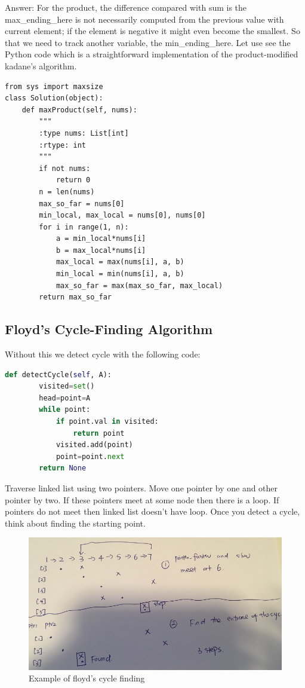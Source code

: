 \documentclass[../specific-algorithms.tex]{subfiles}
\begin{document}
Answer: For the product, the difference compared with sum is the max\_ending\_here is not necessarily computed from the previous value with current element; if the element is negative it might even become the smallest. So that we need to track another variable, the min\_ending\_here. Let use see the Python code which is a straightforward implementation of the product-modified kadane's algorithm. 
\begin{lstlisting}
from sys import maxsize
class Solution(object):
    def maxProduct(self, nums):
        """
        :type nums: List[int]
        :rtype: int
        """
        if not nums:
            return 0
        n = len(nums)
        max_so_far = nums[0]
        min_local, max_local = nums[0], nums[0]
        for i in range(1, n):
            a = min_local*nums[i]
            b = max_local*nums[i]
            max_local = max(nums[i], a, b)
            min_local = min(nums[i], a, b)
            max_so_far = max(max_so_far, max_local)
        return max_so_far
\end{lstlisting}





\subsection{Floyd’s Cycle-Finding Algorithm}

Without this we detect cycle with the following code:
\begin{lstlisting}[language = Python]
def detectCycle(self, A):
        visited=set()       
        head=point=A
        while point:
            if point.val in visited:
                return point
            visited.add(point)
            point=point.next
        return None
\end{lstlisting}

Traverse linked list using two pointers. Move one pointer by one and other pointer by two. If these pointers meet at some node then there is a loop. If pointers do not meet then linked list doesn’t have loop. Once you detect a cycle, think about finding the starting point.
\begin{figure}[h!]
    \centering
    \includegraphics[width = 0.98\columnwidth]{fig/floyd.png}
    \caption{Example of floyd’s cycle finding}
    \label{fig:floyd}
\end{figure}
\end{document}
